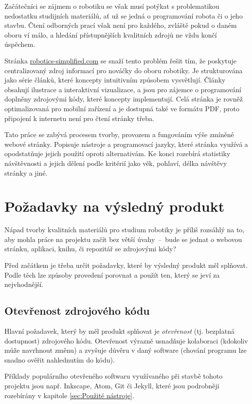 \documentclass[a4paper, 12pt]{article}
\begin{document}
  Začátečníci se zájmem o robotiku se však musí potýkat s problematikou nedostatku studijních materiálů, ať už se jedná o programování robota či o jeho stavbu. Čtení odborných prací však není pro každého, zvláště pokud o daném oboru ví málo, a hledání přístupnějších kvalitních zdrojů ne vždu končí úspěchem.

  Stránka \url{robotics-simplified.com} se snaží tento problém řešit tím, že poskytuje centralizovaný zdroj informací pro nováčky do oboru robotiky. Je strukturována jako série článků, které koncepty intuitivním způsobem vysvětlují. Články obsahují ilustrace a interaktivní vizualizace, a jsou pro zájemce o programování doplněny zdrojovými kódy, které koncepty implementují. Celá stránka je rovněž optimalizovaná pro mobilní zařízení a je dostupná také ve formátu PDF, proto připojení k internetu není pro čtení stránky třeba.

  Tato práce se zabývá procesem tvorby, provozem a fungováním výše zmíněné webové stránky. Popisuje nástroje a programovací jazyky, které stránka využívá a opodstatňuje jejich použití oproti alternativám. Ke konci rozebírá statistiky návštěvnosti a jejich dělení podle kritérií jako věk, pohlaví, délka návštěvy stránky a jiné.

  \newpage

  \section{Požadavky na výsledný produkt} \label{sec:Požadavky na výsledný produkt}
  Nápad tvorby kvalitních materiálů pro studium robotiky je příliš rozsáhlý na to, aby mohla práce na projektu začít bez větší úvahy~--~bude se jednat o webovou stránku, aplikaci, knihu, či repozitář se zdrojovými kódy?

  Před začátkem je třeba určit požadavky, které by výsledný produkt měl splňovat. Podle těch lze způsoby provedení porovnat a použít ten, který se jeví za nejvhodnější.


  \subsection{Otevřenost zdrojového kódu}
  Hlavní požadavek, který by měl produkt splňovat je \emph{otevřenost} (tj. bezplatná dostupnost) zdrojového kódu. Otevřenost výrazně usnadňuje kolaboraci (kdokoliv může navrhnout změnu) a zvyšuje důvěru v daný software (chování programu lze snadno ověřit nahlednutím do kódu).

  Příklady populárního otevřeného softwaru využívaného při stavbě tohoto projektu jsou např. Inkscape, Atom, Git či Jekyll, které jsou podrobněji rozebírány v kapitole \ref{sec:Použité nástroje}.
\end{document}
